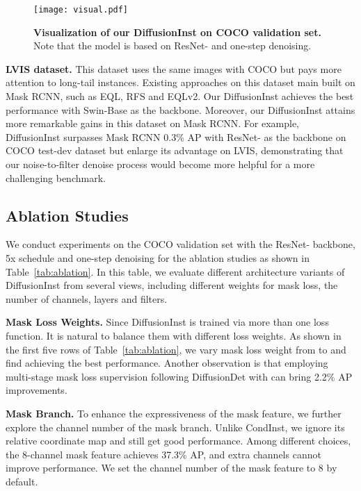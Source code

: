 \documentclass{article}
\begin{document}
\begin{figure*}[t!]
\centering
\texttt{[image: visual.pdf]}
\caption{\textbf{Visualization of our DiffusionInst on COCO validation set.} Note that the model is based on ResNet- and one-step denoising.}
\label{visualizations}
\end{figure*}

\noindent\textbf{LVIS dataset.} This dataset uses the same images with COCO but pays more attention to long-tail instances. Existing approaches on this dataset main built on Mask RCNN, such as EQL\cite{tan2020equalization}, RFS\cite{LVIS} and EQLv2\cite{tan2021equalization}. Our DiffusionInst achieves the best performance with Swin-Base as the backbone. Moreover, our DiffusionInst attains more remarkable gains in this dataset on Mask RCNN. For example, DiffusionInst surpasses Mask RCNN 0.3\% AP with ResNet- as the backbone on COCO test-dev dataset but enlarge its advantage on LVIS, demonstrating that our noise-to-filter denoise process would become more helpful for a more challenging benchmark.



\subsection{Ablation Studies}

We conduct experiments on the COCO validation set with the ResNet- backbone, 5x schedule and one-step denoising for the ablation studies as shown in Table~\ref{tab:ablation}. In this table, we evaluate different architecture variants of DiffusionInst from several views, including different weights for mask loss, the number of channels, layers and filters.

\noindent\textbf{Mask Loss Weights.} Since DiffusionInst is trained via more than one loss function. It is natural to balance them with different loss weights. As shown in the first five rows of Table~\ref{tab:ablation}, we vary mask loss weight  from  to  and find  achieving the best performance. Another observation is that employing multi-stage mask loss supervision following DiffusionDet with  can bring 2.2\% AP improvements.


\noindent\textbf{Mask Branch.} To enhance the expressiveness of the mask feature, we further explore the channel number of the mask branch. Unlike CondInst, we ignore its relative coordinate map and still get good performance. 
Among different choices, the 8-channel mask feature achieves 37.3\% AP, and extra channels cannot improve performance. We set the channel number of the mask feature to 8 by default. 
\end{document}
